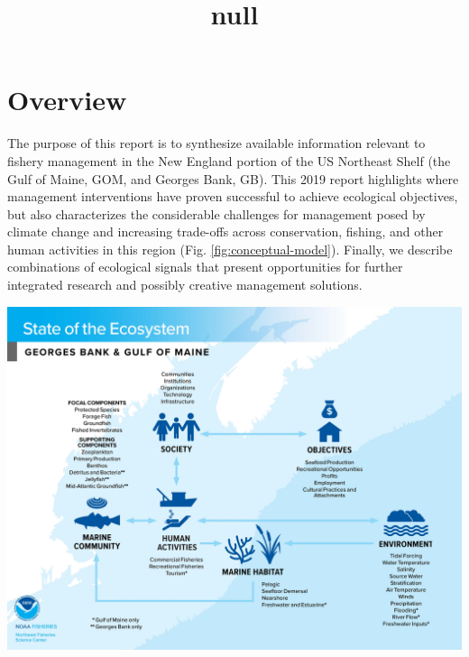 \documentclass[10pt,]{article}
\title{null}
\author{}
\date{}
\let\origfigure\figure
\let\endorigfigure\endfigure
\renewenvironment{figure}[1][2] {
    \expandafter\origfigure\expandafter[H]
} {
    \endorigfigure
}
\begin{document}
\maketitle

\section{Overview}\label{overview}

The purpose of this report is to synthesize available information
relevant to fishery management in the New England portion of the US
Northeast Shelf (the Gulf of Maine, GOM, and Georges Bank, GB). This
2019 report highlights where management interventions have proven
successful to achieve ecological objectives, but also characterizes the
considerable challenges for management posed by climate change and
increasing trade-offs across conservation, fishing, and other human
activities in this region (Fig. \ref{fig:conceptual-model}). Finally, we
describe combinations of ecological signals that present opportunities
for further integrated research and possibly creative management
solutions.

\begin{figure}

{\centering \includegraphics[width=\textwidth]{images/GOM_GB_conmod_overview} 

}

\caption{A conceptual model places detailed species-level management in context by highlighting relationships between focal species groups organized by the New England Fishery Management Council (NEFMC) Fishery Management Plan (FMP), managed human activities, environmental drivers, habitats, and key ecological links.}\label{fig:conceptual-model}
\end{figure}
\end{document}
